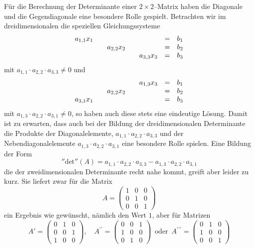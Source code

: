 Für die Berechnung der Determinante einer $2 \times 2$--Matrix haben die Diagonale und die Gegendiagonale 
eine besondere Rolle gespielt. Betrachten wir im dreidimensionalen die speziellen Gleichungssysteme
  	\begin{equation}\label{lin_gls_3_main_diag} 
  	\begin{array} {l c l c l c l}
  	a_{1,1} x_1 &   &   &   &   & = & b_1 \\
    	&   & a_{2,2} x_2 &  &   & = & b_2 \\
    	&   &   &   & a_{3,3} x_3 & = & b_3 \\
  	\end{array} 
  	\end{equation}
mit $a_{1,1} \cdot a_{2,2} \cdot a_{3,3} \neq 0$ und 
  	\begin{equation}\label{lin_gls_3_gegen_diag} 
  	\begin{array} {l c l c l c l}
    	&   &   &  & a_{1,3} x_3 & = & b_1 \\
    	&   & a_{2,2} x_2 &   &   & = & b_2 \\
	a_{3,1} x_1 &   &  & &  & = & b_3 \\
  	\end{array} 
  	\end{equation}
mit $a_{1,3} \cdot a_{2,2} \cdot a_{3,1} \neq 0$, so haben auch diese stets eine eindeutige Lösung. Damit 
ist zu erwarten, dass auch bei der Bildung der dreidimensionalen Determinante die Produkte der Diagonalelemente, 
$a_{1,1} \cdot a_{2,2} \cdot a_{3,3}$ und der Nebendiagonalelemente $a_{1,3} \cdot a_{2,2} \cdot a_{3,1}$ eine 
besondere Rolle spielen. Eine Bildung der Form
  	$$ \mathrm{''det''}(A) = a_{1,1} \cdot a_{2,2} \cdot a_{3,3} - a_{1,3} \cdot a_{2,2} \cdot a_{3,1} $$
die der zweidimensionalen Determinante recht nahe kommt, greift aber leider zu kurz. 
Sie liefert zwar für die Matrix 
  	$$ A = \left( \begin{matrix} 1 & 0 & 0 \\ 0 & 1 & 0 \\ 0 & 0 & 1 \end{matrix} \right) $$
ein Ergebnis wie gewünscht, nämlich den Wert $1$, aber für Matrizen
  	$$ A' = \left( \begin{matrix} 0 & 1 & 0 \\ 0 & 0 & 1 \\ 1 & 0 & 0 \end{matrix} \right), \quad 
   	A^{\prime \prime} = \left( \begin{matrix} 0 & 0 & 1 \\ 1 & 0 & 0 \\ 0 & 1 & 0 \end{matrix} \right) 
  	\, \textrm{ oder } \, 
  	A^{\prime \prime \prime} = \left( \begin{matrix} 0 & 1 & 0 \\ 1 & 0 & 0 \\ 0 & 0 & 1 \end{matrix} \right) $$
